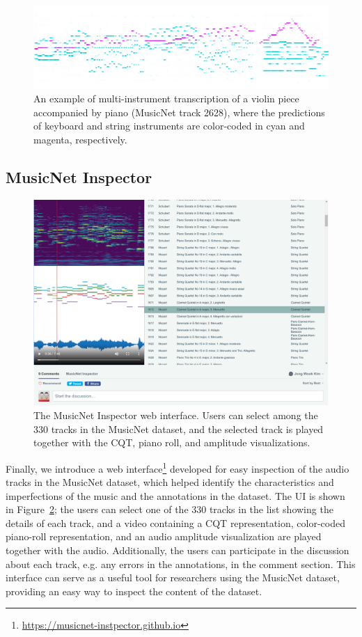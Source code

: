 \begin{figure}
	\centering
	\includegraphics[width=\textwidth]{2628.png}
	\caption{An example of multi-instrument transcription of a violin piece accompanied by piano (MusicNet track 2628), where the predictions of keyboard and string instruments are color-coded in cyan and magenta, respectively. }\label{fig:multi-instrument-example}
\end{figure}

\subsection{MusicNet Inspector}

\begin{figure}[t]
\includegraphics[width=\textwidth]{musicnet-inspector.png}
\caption{The MusicNet Inspector web interface. Users can select among the 330 tracks in the MusicNet dataset, and the selected track is played together with the CQT, piano roll, and amplitude visualizations.}\label{fig:musicnet-inspector}
\end{figure}

Finally, we introduce a web interface\footnote{\url{https://musicnet-instpector.github.io}} developed for easy inspection of the audio tracks in the MusicNet dataset, which helped identify the characteristics and imperfections of the music and the annotations in the dataset.
The UI is shown in Figure~\ref{fig:musicnet-inspector}; the users can select one of the 330 tracks in the list showing the details of each track, and a video containing a CQT representation, color-coded piano-roll representation, and an audio amplitude visualization are played together with the audio.
Additionally, the users can participate in the discussion about each track, e.g. any errors in the annotations, in the comment section.
This interface can serve as a useful tool for researchers using the MusicNet dataset, providing an easy way to inspect the content of the dataset.

